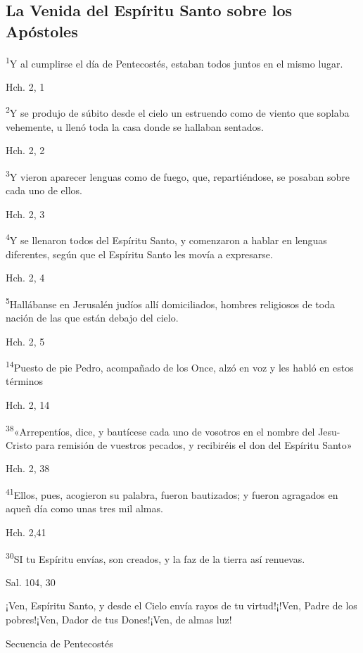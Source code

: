 \documentclass[a4paper,11pt]{article}
\begin{document}
    \subsection*{\hfil La Venida del Espíritu Santo sobre los Apóstoles \hfil}
      \textsuperscript{1}Y al cumplirse el día de Pentecostés, estaban todos juntos en el mismo lugar.
      \begin{flushright}
        Hch. 2, 1
      \end{flushright}      
      \textsuperscript{2}Y se produjo de súbito desde el cielo un estruendo como de viento que soplaba vehemente, u llenó toda la casa
      donde se hallaban sentados.
      \begin{flushright}
        Hch. 2, 2
      \end{flushright}      
      \textsuperscript{3}Y vieron aparecer lenguas como de fuego, que, repartiéndose, se posaban sobre cada uno de ellos.
      \begin{flushright}
        Hch. 2, 3
      \end{flushright}      
      \textsuperscript{4}Y se llenaron todos del Espíritu Santo, y comenzaron a hablar en lenguas diferentes, según que el Espíritu Santo les movía
      a expresarse.
      \begin{flushright}
        Hch. 2, 4
      \end{flushright}      
      \textsuperscript{5}Hallábanse en Jerusalén judíos allí domiciliados, hombres religiosos de toda nación de las que están debajo del cielo.
      \begin{flushright}
        Hch. 2, 5
      \end{flushright}      
      \textsuperscript{14}Puesto de pie Pedro, acompañado de los Once, alzó en voz y les habló en estos términos
      \begin{flushright}
        Hch. 2, 14
      \end{flushright}      
      \textsuperscript{38}«Arrepentíos, dice, y bautícese cada uno de vosotros en el nombre del Jesu-Cristo para remisión de vuestros pecados, y recibiréis el don
      del Espíritu Santo»
      \begin{flushright}
        Hch. 2, 38
      \end{flushright}      
      \textsuperscript{41}Ellos, pues, acogieron su palabra, fueron bautizados; y fueron agragados en aqueñ día como unas tres mil almas.
      \begin{flushright}
        Hch. 2,41
      \end{flushright}      
      \textsuperscript{30}SI tu Espíritu envías, son creados, y la faz de la tierra así renuevas.
      \begin{flushright}
        Sal. 104, 30
      \end{flushright}      
      ¡Ven, Espíritu Santo, y desde el Cielo envía rayos de tu virtud!¡!Ven, Padre de los pobres!¡Ven, Dador de tus Dones!¡Ven, de almas luz!
      \begin{flushright}
        Secuencia de Pentecostés
      \end{flushright}
\end{document}
